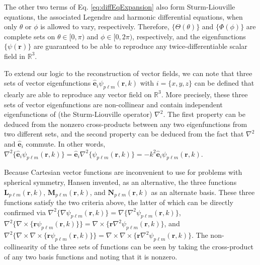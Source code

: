 \documentclass{article}
\begin{document}
The other two terms of Eq. \eqref{eq:diffEqExpansion} also form Sturm-Liouville equations, the associated Legendre and harmonic differential equations, when only $\theta$ or $\phi$ is allowed to vary, respectively. Therefore, $\{\Theta(\theta)\}$ and $\{\Phi(\phi)\}$ are complete sets on $\theta\in[0,\pi)$ and $\phi\in[0,2\pi)$, respectively, and the eigenfunctions $\{\psi(\mathbf{r})\}$ are guaranteed to be able to reproduce any twice-differentiable scalar field in $\mathbb{R}^3$.

To extend our logic to the reconstruction of vector fields, we can note that three sets of vector eigenfunctions $\hat{\mathbf{e}}_i\psi_{p\ell m}(\mathbf{r},k)$ with $i = \{x,y,z\}$ can be defined that clearly are able to reproduce any vector field on $\mathbb{R}^3$. More precisely, these three sets of vector eigenfunctions are non-collinear\cite{stratton1941electromagnetic} and contain independent eigenfunctions of (the Sturm-Liouville operator) $\nabla^2$. The first property can be deduced from the nonzero cross-products between any two eigenfunctions from two different sets, and the second property can be deduced from the fact that $\nabla^2$ and $\hat{\mathbf{e}}_i$ commute. In other words, $\nabla^2\{\hat{\mathbf{e}}_i\psi_{p\ell m}(\mathbf{r},k)\} = \hat{\mathbf{e}}_i\nabla^2\{\psi_{p\ell m}(\mathbf{r},k)\} = -k^2\hat{\mathbf{e}}_i\psi_{p\ell m}(\mathbf{r},k)$.

Because Cartesian vector functions are inconvenient to use for problems with spherical symmetry, Hansen\cite{hansen1935new} invented, as an alternative, the three functions $\mathbf{L}_{p\ell m}(\mathbf{r},k)$, $\mathbf{M}_{p\ell m}(\mathbf{r},k)$, and $\mathbf{N}_{p\ell m}(\mathbf{r},k)$ as an alternate basis. These three functions satisfy the two criteria above, the latter of which can be directly confirmed via $\nabla^2\{\nabla\psi_{p\ell m}(\mathbf{r},k)\} = \nabla\{\nabla^2\psi_{p\ell m}(\mathbf{r},k)\}$, $\nabla^2\{\nabla\times\{\mathbf{r}\psi_{p\ell m}(\mathbf{r},k)\}\} = \nabla\times\{\mathbf{r}\nabla^2\psi_{p\ell m}(\mathbf{r},k)\}$, and $\nabla^2\{\nabla\times\nabla\times\{\mathbf{r}\psi_{p\ell m}(\mathbf{r},k)\}\} = \nabla\times\nabla\times\{\mathbf{r}\nabla^2\psi_{p\ell m}(\mathbf{r},k)\}$. The non-collinearity of the three sets of functions can be seen by taking the cross-product of any two basis functions and noting that it is nonzero. 
\end{document}
